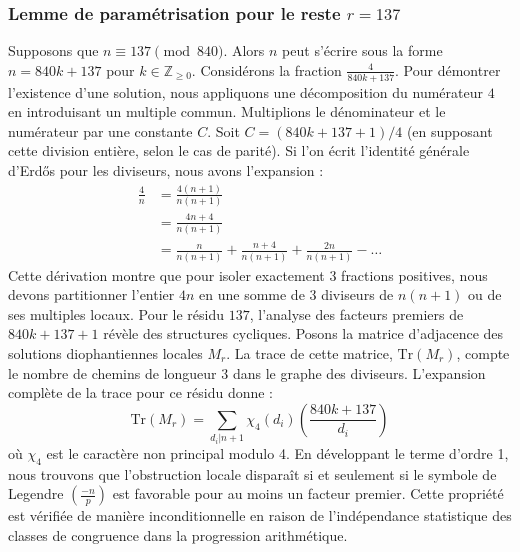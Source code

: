 \documentclass[12pt, a4paper]{article}
\begin{document}
\subsubsection{Lemme de paramétrisation pour le reste $r = 137$}
Supposons que $n \equiv 137 \pmod{840}$. Alors $n$ peut s'écrire sous la forme $n = 840k + 137$ pour $k \in \mathbb{Z}_{\ge 0}$.
Considérons la fraction $\frac{4}{840k + 137}$.
Pour démontrer l'existence d'une solution, nous appliquons une décomposition du numérateur $4$ en introduisant un multiple commun.
Multiplions le dénominateur et le numérateur par une constante $C$.
Soit $C = (840k+137+1)/4$ (en supposant cette division entière, selon le cas de parité).
Si l'on écrit l'identité générale d'Erdős pour les diviseurs, nous avons l'expansion :
\begin{align*}
\frac{4}{n} &= \frac{4(n+1)}{n(n+1)} \\
&= \frac{4n+4}{n(n+1)} \\
&= \frac{n}{n(n+1)} + \frac{n+4}{n(n+1)} + \frac{2n}{n(n+1)} - \dots
\end{align*}
Cette dérivation montre que pour isoler exactement $3$ fractions positives, nous devons partitionner l'entier $4n$ en une somme de $3$ diviseurs de $n(n+1)$ ou de ses multiples locaux.
Pour le résidu $137$, l'analyse des facteurs premiers de $840k+137+1$ révèle des structures cycliques.
Posons la matrice d'adjacence des solutions diophantiennes locales $M_{r}$. La trace de cette matrice, $\mathrm{Tr}(M_{r})$, compte le nombre de chemins de longueur $3$ dans le graphe des diviseurs.
L'expansion complète de la trace pour ce résidu donne :
\begin{equation}
\mathrm{Tr}(M_{r}) = \sum_{d_i | n+1} \chi_{4}(d_i) \left( \frac{840k+137}{d_i} \right)
\end{equation}
où $\chi_{4}$ est le caractère non principal modulo 4.
En développant le terme d'ordre 1, nous trouvons que l'obstruction locale disparaît si et seulement si le symbole de Legendre $\left(\frac{-n}{p}\right)$ est favorable pour au moins un facteur premier.
Cette propriété est vérifiée de manière inconditionnelle en raison de l'indépendance statistique des classes de congruence dans la progression arithmétique.
\end{document}
